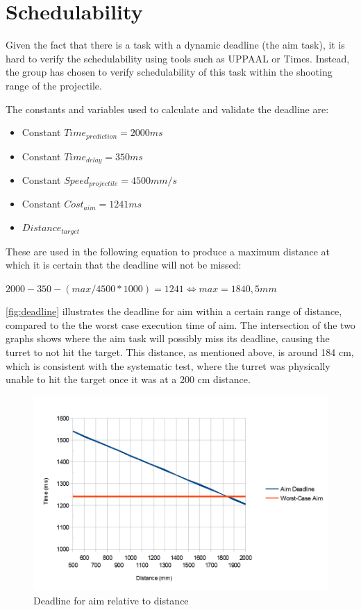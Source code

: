 \section{Schedulability}
Given the fact that there is a task with a dynamic deadline (the aim task), it is hard to verify the schedulability using tools such as UPPAAL or Times. Instead, the group has chosen to verify schedulability of this task within the shooting range of the projectile.


The constants and variables used to calculate and validate the deadline are:
\begin{itemize}
	\item Constant $Time_{prediction} = 2000 ms$
	\item Constant $Time_{delay} = 350 ms$
	\item Constant $Speed_{projectile} = 4500 mm/s$
	\item Constant $Cost_{aim} = 1241 ms$ 
	\item $Distance_{target}$
\end{itemize}

These are used in the following equation to produce a maximum distance at which it is certain that the deadline will not be missed: 

$2000-350-(max/4500*1000)=1241 \Leftrightarrow max = 1840,5 mm$

\autoref{fig:deadline} illustrates the deadline for aim within a certain range of distance, compared to the the worst case execution time of aim. The intersection of the two graphs shows where the aim task will possibly miss its deadline, causing the turret to not hit the target. This distance, as mentioned above, is around 184 cm, which is consistent with the systematic test, where the turret was physically unable to hit the target once it was at a 200 cm distance. 

\begin{figure}
	\includegraphics[scale=0.5]{img/deadline.png}
	\caption{Deadline for aim relative to distance}
	\label{fig:deadline}
\end{figure}
